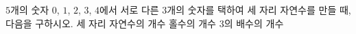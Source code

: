 $5$개의 숫자 $0$, $1$, $2$, $3$, $4$에서 서로 다른 $3$개의 숫자를 택하여 세 자리 자연수를 만들 때, 다음을 구하시오.
 세 자리 자연수의 개수
 홀수의 개수
 $3$의 배수의 개수
